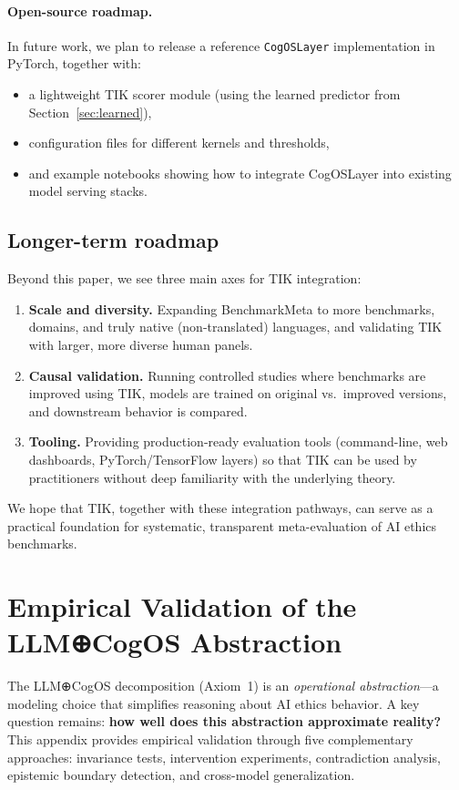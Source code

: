 \documentclass[11pt]{article}
\begin{document}
\paragraph{Open-source roadmap.} In future work, we plan to release a reference \texttt{CogOSLayer} implementation in PyTorch, together with:
\begin{itemize}
    \item a lightweight TIK scorer module (using the learned predictor from Section~\ref{sec:learned}),
    \item configuration files for different kernels and thresholds,
    \item and example notebooks showing how to integrate CogOSLayer into existing model serving stacks.
\end{itemize}

\subsection{Longer-term roadmap}

Beyond this paper, we see three main axes for TIK integration:

\begin{enumerate}
    \item \textbf{Scale and diversity.} Expanding BenchmarkMeta to more benchmarks, domains, and truly native (non-translated) languages, and validating TIK with larger, more diverse human panels.
    \item \textbf{Causal validation.} Running controlled studies where benchmarks are improved using TIK, models are trained on original vs.\ improved versions, and downstream behavior is compared.
    \item \textbf{Tooling.} Providing production-ready evaluation tools (command-line, web dashboards, PyTorch/TensorFlow layers) so that TIK can be used by practitioners without deep familiarity with the underlying theory.
\end{enumerate}

We hope that TIK, together with these integration pathways, can serve as a practical foundation for systematic, transparent meta-evaluation of AI ethics benchmarks.


\section{Empirical Validation of the LLM⊕CogOS Abstraction}
\label{app:cogos-validation}

The LLM⊕CogOS decomposition (Axiom~1) is an \emph{operational abstraction}—a modeling choice that simplifies reasoning about AI ethics behavior. A key question remains: \textbf{how well does this abstraction approximate reality?} This appendix provides empirical validation through five complementary approaches: invariance tests, intervention experiments, contradiction analysis, epistemic boundary detection, and cross-model generalization.
\end{document}
